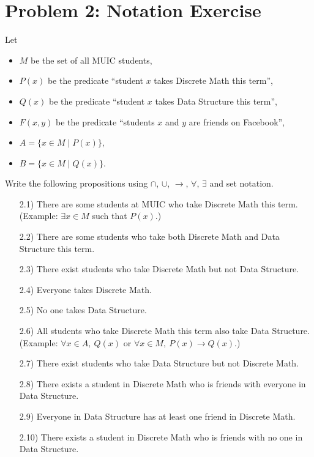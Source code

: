 \section*{Problem 2: Notation Exercise}
Let
\begin{itemize}
    \item $M$ be the set of all MUIC students,
    \item $P(x)$ be the predicate ``student $x$ takes Discrete Math this term'',
    \item $Q(x)$ be the predicate ``student $x$ takes Data Structure this term'',
    \item $F(x,y)$ be the predicate ``students $x$ and $y$ are friends on Facebook'',
    \item $A = \{x \in M \mid P(x)\}$,
    \item $B = \{x \in M \mid Q(x)\}$.
\end{itemize}
Write the following propositions using $\cap$, $\cup$, $\rightarrow$, $\forall$, $\exists$ and set notation.
\begin{enumerate}
    \item[2.1)] There are some students at MUIC who take Discrete Math this term. (Example: $\exists x \in M$ such that $P(x)$.)
    \item[2.2)] There are some students who take both Discrete Math and Data Structure this term.
    \item[2.3)] There exist students who take Discrete Math but not Data Structure.
    \item[2.4)] Everyone takes Discrete Math.
    \item[2.5)] No one takes Data Structure.
    \item[2.6)] All students who take Discrete Math this term also take Data Structure. (Example: $\forall x \in A,\ Q(x)$ or $\forall x \in M,\ P(x) \rightarrow Q(x)$.)
    \item[2.7)] There exist students who take Data Structure but not Discrete Math.
    \item[2.8)] There exists a student in Discrete Math who is friends with everyone in Data Structure.
    \item[2.9)] Everyone in Data Structure has at least one friend in Discrete Math.
    \item[2.10)] There exists a student in Discrete Math who is friends with no one in Data Structure.
\end{enumerate}

\medskip
\solution

